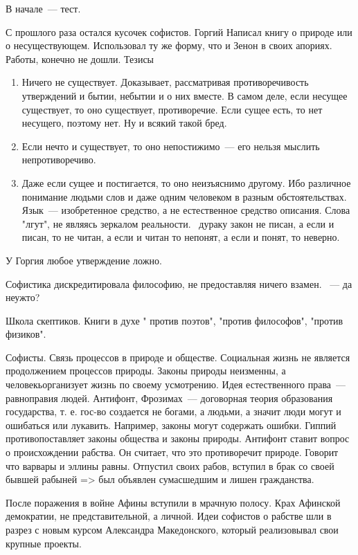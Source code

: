 В начале~--- тест. 

С прошлого раза остался кусочек софистов. 
Горгий 
Написал книгу о природе или о несуществующем. Использовал ту же форму, что и Зенон в своих апориях. Работы, конечно не дошли. 
Тезисы

\begin{enumerate}
	\item Ничего не существует. Доказывает, рассматривая противоречивость утверждений и бытии, небытии и о них вместе. 
	В самом деле, если несущее существует, то оно существует, противоречие. Если сущее есть, то нет несущего, поэтому нет. Ну и всякий такой бред. 
	\item Если нечто и существует, то оно непостижимо~--- его нельзя мыслить непротиворечиво. 
	\item Даже если сущее и постигается, то оно неизъяснимо другому. Ибо различное понимание людьми слов и даже одним человеком в разным обстоятельствах. 
	Язык~--- изобретенное средство, а не естественное средство описания. Слова "лгут", не являясь зеркалом реальности. ~дураку закон не писан, а если и писан, то не читан, а если и читан то непонят, а если и понят, то неверно. 
\end{enumerate}

У Горгия любое утверждение ложно. 

Софистика дискредитировала философию, не предоставляя ничего взамен. ~--- да неужто?

Школа скептиков. Книги в духе " против поэтов", "против философов", "против физиков". 

Софисты. 
Связь процессов в природе и обществе. Социальная жизнь не является продолжением процессов природы. Законы природы неизменны, а человекьорганизует жизнь по своему усмотрению. 
Идея естественного права~--- равноправия людей. Антифонт, Фрозимах~--- договорная теория образования государства, т. е. гос-во создается не богами, а людьми, а значит люди могут и ошибаться или лукавить. Например, законы могут содержать ошибки. 
Гиппий противопоставляет законы общества и законы природы. Антифонт ставит вопрос о происхождении рабства. 
Он считает, что это противоречит природе. Говорит что варвары и эллины равны. 
Отпустил своих рабов, вступил в брак со своей бывшей рабыней => был объявлен сумасшедшим и лишен гражданства. 

После поражения в войне Афины вступили в мрачную полосу. Крах Афинской демократии, не представительной, а личной. Идеи софистов о рабстве шли в разрез с новым курсом Александра Македонского, который реализовывал свои крупные проекты. 

